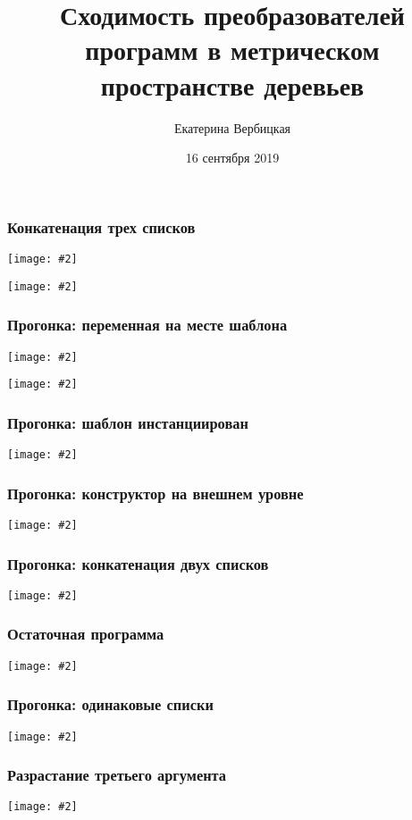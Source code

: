 \documentclass{beamer}
\title[]{Сходимость преобразователей программ в метрическом пространстве деревьев}
\subtitle[]{}
\institute[]{
Лаборатория языков инструментов JetBrains\\
}
\author[]{Екатерина Вербицкая}
\date{16 сентября 2019}
\newcommand{\incimage}[2][0.8]{ 
  \begin{center}   
    \texttt{[image: \#2]}
  \end{center}
  }
\begin{document}
{
  \begin{frame}
    \titlepage
  \end{frame}
}

\begin{frame}[fragile]
  \transwipe[direction=90]
  \frametitle{Конкатенация трех списков}

  \incimage{appdef.png}

  \incimage{apptree0.png}
\end{frame}

\begin{frame}[fragile]
  \transwipe[direction=90]
  \frametitle{Прогонка: переменная на месте шаблона}

  \incimage{appdef.png}

  \incimage{apptree1.png}
\end{frame}

\begin{frame}[fragile]
  \transwipe[direction=90]
  \frametitle{Прогонка: шаблон инстанциирован}

    \incimage{apptree2.png}

\end{frame}

\begin{frame}[fragile]
  \transwipe[direction=90]
  \frametitle{Прогонка: конструктор на внешнем уровне}


    \incimage{apptree3.png}

\end{frame}

\begin{frame}[fragile]
  \transwipe[direction=90]
  \frametitle{Прогонка: конкатенация двух списков}


    \incimage{apptree4.png}

\end{frame}

\begin{frame}[fragile]
  \transwipe[direction=90]
  \frametitle{Остаточная программа}


    \incimage{appres.png}

\end{frame}

\begin{frame}[fragile]
  \transwipe[direction=90]
  \frametitle{Прогонка: одинаковые списки}


    \incimage{appsame0.png}

\end{frame}

\begin{frame}[fragile]
  \transwipe[direction=90]
  \frametitle{Разрастание третьего аргумента}


    \incimage{appsame1.png}

\end{frame}
\end{document}
